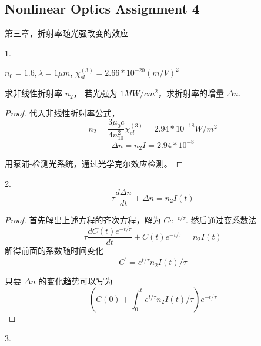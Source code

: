 \subsection{Nonlinear Optics Assignment 4}

第三章，折射率随光强改变的效应

\begin{exercise}

1. 

$n_0=1.6,\lambda = 1\mu m$, $ \chi_{sl}^{(3)}=2.66*10^{-20} (m/V)^2$

求非线性折射率 $n_2$， 若光强为 $1MW/cm^2$，求折射率的增量 $\Delta n$.

\end{exercise}

\begin{proof}
代入非线性折射率公式，
$$n_2=\frac{3\mu_0 c}{4n_{10}^{2}} \chi_{sl}^{(3)}=2.94*10^{-18} W/m^2 $$
$$\Delta n = n_2 I = 2.94*10^{-8} $$

用泵浦-检测光系统，通过光学克尔效应检测。
\end{proof}

\begin{exercise}
2.
$$\tau \frac{d\Delta n}{dt}+\Delta n=n_2 I(t)$$    
\end{exercise}

\begin{proof}
首先解出上述方程的齐次方程，解为 $C e^{-t/\tau}$.
然后通过变系数法 $$\tau \frac{d C(t)e^{-t/\tau}}{dt}+ C(t)e^{-t/\tau}=n_2I(t)$$
解得前面的系数随时间变化$$C^\prime=e^{t/\tau}n_2I(t)/\tau $$


只要 $\Delta n$ 的变化趋势可以写为 
$$(C(0)+\int_0^t e^{t/\tau}n_2I(t)/\tau)e^{-t/\tau}$$

\end{proof}


\begin{exercise}
3.
\end{exercise}

